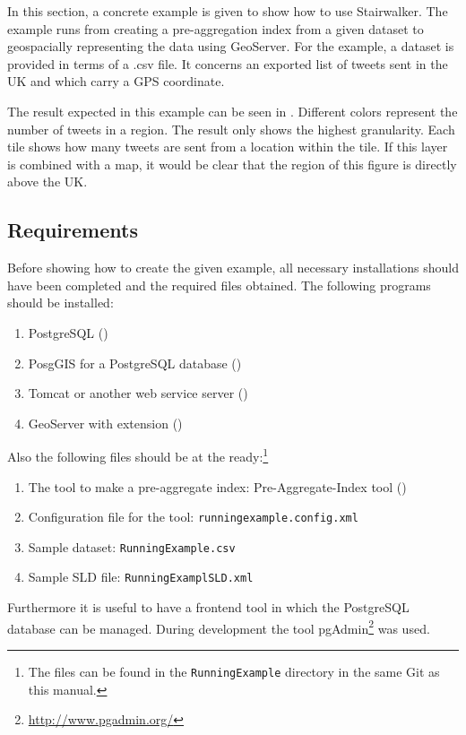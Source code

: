 In this section, a concrete example is given to show how to use Stairwalker.
The example runs from creating a pre-aggregation index from a given dataset
to geospacially representing the data using GeoServer. For the example, a
dataset is provided in terms of a .csv file. It concerns an exported list
of tweets sent in the UK and which carry a GPS coordinate.

The result expected in this example can be seen in .
Different colors represent the number of tweets in a region. The result
only shows the highest granularity. Each tile shows how many tweets are
sent from a location within the tile.  If this layer is combined with a
map, it would be clear that the region of this figure is directly above the
UK.

\subsection{Requirements}
Before showing how to create the given example, all necessary installations
should have been completed and the required files obtained.
The following programs should be installed:
\begin{enumerate}
	\item PostgreSQL ()
	\item PosgGIS for a PostgreSQL database ()
	\item Tomcat or another web service server ()
	\item GeoServer with extension ()
\end{enumerate}
Also the following files should be at the ready:\footnote{The files can be
found in the \lstinline|RunningExample| directory in the same Git as this
manual.}
\begin{enumerate}
	\item The tool to make a pre-aggregate index: Pre-Aggregate-Index tool
		()
	\item Configuration file for the tool: \lstinline|runningexample.config.xml|
	\item Sample dataset: \lstinline|RunningExample.csv|
	\item Sample SLD file: \lstinline|RunningExamplSLD.xml|
\end{enumerate}
Furthermore it is useful to have a frontend tool in which the PostgreSQL
database can be managed. During development the tool
pgAdmin\footnote{\url{http://www.pgadmin.org/}} was used.

